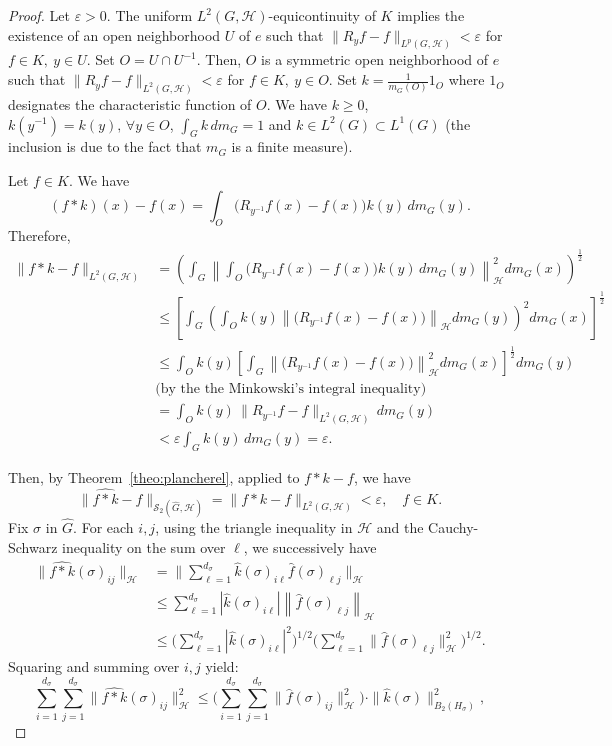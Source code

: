 \documentclass[10pt,a4paper]{amsart}
\begin{document}
\begin{proof}
Let $\varepsilon>0$. The uniform $L^2(G,\mathcal{H})$-equicontinuity of $K$ implies the existence of an open neighborhood $U$ of $e$ such that $\|R_yf-f\|_{L^p(G,\mathcal{H})}
<\varepsilon$ for $f\in K,\ y\in U$.  
 Set $O=U\cap U^{-1}$. Then, $O$
is a symmetric open neighborhood  of $e$ 
such that $\|R_yf-f\|_{L^2(G,\mathcal{H})}<\varepsilon$ for $f\in K,\ y\in O$.  Set $k=\displaystyle\frac{1}{m_G(O)}1_O$ where $1_O$ designates the characteristic function of $O$. We have 
 $k\ge0$, $k(y^{-1})=k(y), \, \forall y\in O$, $\displaystyle\int_Gk\,dm_G=1$ and 
$k\in  L^2(G)\subset L^1(G)$ (the inclusion is due to the fact that $m_G$ is a finite measure).

Let $f\in K$. We have  $$(f*k)(x)-f(x)=\int_O\big(R_{y^{-1}}f(x)-f(x)\big)k(y)\,dm_G(y).$$ 
Therefore, 
\begin{align*}
\|f*k-f\|_{L^2(G,\mathcal{H})}&=\left(\int_G\left\|\int_O\big(R_{y^{-1}}f(x)-f(x)\big)k(y)\,dm_G(y)\right\|_{\mathcal{H}}^2dm_G(x)\right)^{\frac{1}{2}}\\
&\le \left[\int_G\left(\int_O k(y)\left\|\big(R_{y^{-1}}f(x)-f(x)\big)\right\|_{\mathcal{H}}dm_G(y)\right)^2dm_G(x)\right]^{\frac{1}{2}}\\
&\leq \int_O k(y) \left[\int_G \left\|\big(R_{y^{-1}}f(x)-f(x)\big)\right\|_{\mathcal{H}}^2 dm_G(x)\right]^{\frac{1}{2}} dm_G(y)\\
&\text{(by the the Minkowski's integral inequality)}\\
&=\int_Ok(y)\,\|R_{y^{-1}}f-f\|_{L^2(G,\mathcal{H})}\,dm_G(y)\\
&<\varepsilon \int_Gk(y)\,dm_G(y)=\varepsilon.
\end{align*}

Then, by Theorem~\ref{theo:plancherel}, 
 applied to $f*k-f$, we have
$$
\|\widehat{f*k}-\widehat f\|_{\mathscr{S}_2(\widehat{G},\mathcal{H})}=\|f*k-f\|_{L^2(G,\mathcal{H})}<\varepsilon,\quad f\in K.
$$
 Fix $\sigma$ in $\widehat{G}$. For each $i,j$, using the triangle inequality in $\mathcal{H}$ and the  Cauchy-Schwarz inequality on the sum over $\ell$, we successively have
 \begin{align*}
\big\|\widehat{f*k}(\sigma)_{ij}\big\|_\mathcal{H}&=\Big\|\sum_{\ell=1}^{d_\sigma}\widehat k(\sigma)_{i\ell}
\widehat{f}(\sigma)_{\ell j}\Big\|_\mathcal{H}\\
&\leq \sum_{\ell=1}^{d_\sigma}|\widehat k(\sigma)_{i\ell}|
\left\|\widehat{f}(\sigma)_{\ell j}\right\|_\mathcal{H}\\
&\le\Big(\sum_{\ell=1}^{d_\sigma}|\widehat k(\sigma)_{i\ell}|^2\Big)^{1/2}
\Big(\sum_{\ell=1}^{d_\sigma}\|\widehat{f}(\sigma)_{\ell j}\|_\mathcal{H}^2\Big)^{1/2}.
\end{align*}
Squaring and  summing over $i,j$  yield:
\begin{equation}\label{Path}
\sum_{i=1}^{d_\sigma}\sum_{j=1}^{d_\sigma}\big\|\widehat{f*k}(\sigma)_{ij}\big\|_\mathcal{H}^2\le\Big(\sum_{i=1}^{d_\sigma}\sum_{j=1}^{d_\sigma}
\|\widehat{f}(\sigma)_{ij}\|_\mathcal{H}^2\Big)\cdot\|\widehat k(\sigma)\|_{B_2(H_\sigma)}^2,
\end{equation}
 

\end{proof}
\end{document}
